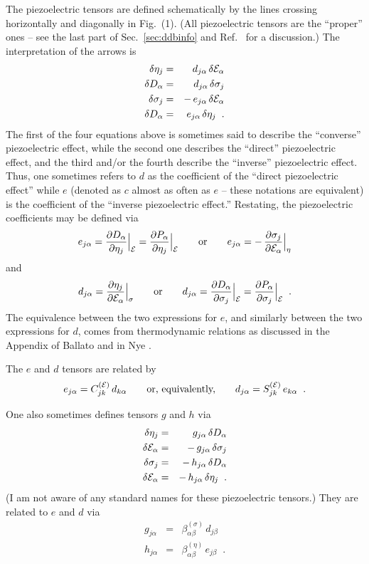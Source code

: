 \documentclass[11pt,fleqn]{article}
\def\bea{\begin{eqnarray}}
\def\nn{\nonumber\\}
\def\eea{\end{eqnarray}}
\def\beq{\begin{equation}}
\def\eeq{\end{equation}}
\def\E{{\cal E}}
\begin{document}
The piezoelectric tensors are defined schematically by the lines
crossing horizontally and diagonally in Fig.~(1).  (All piezoelectric
tensors are the ``proper'' ones -- see the last part of
Sec.~\ref{sec:ddbinfo} and Ref.~\cite{dv-piezo} for a discussion.)
The interpretation of the arrows is
%
\bea
\delta\eta_j &=& d_{j\alpha}\,\delta\E_\alpha
\nn
\delta D_\alpha &=& d_{j\alpha}\,\delta\sigma_j
\nn
\delta\sigma_j &=& -\,e_{j\alpha}\,\delta\E_\alpha
\nn
\delta D_\alpha &=& e_{j\alpha}\,\delta\eta_j
\;\;.
\eea
%
The first of the four equations above is sometimes said to describe
the ``converse'' piezoelectric effect, while the second one
describes the ``direct'' piezoelectric effect, and the third and/or
the fourth describe the ``inverse'' piezoelectric effect.  Thus,
one sometimes refers to $d$ as the coefficient of the ``direct
piezoelectric effect'' while $e$ (denoted as $c$ almost as often as
$e$ -- these notations are equivalent) is the coefficient of the
``inverse piezoelectric effect.''  Restating, the piezoelectric
coefficients may be defined via
%
\beq
e_{j\alpha}={\partial D_\alpha\over\partial\eta_j} \Big\vert_\E
           ={\partial P_\alpha\over\partial\eta_j} \Big\vert_\E
\qquad {\rm or} \qquad
e_{j\alpha}=-\,{\partial \sigma_j\over\partial\E_\alpha} \Big\vert_\eta
\label{eq:e-def}
\eeq
%
and
%
\beq
d_{j\alpha}= {\partial\eta_j\over\partial\E_\alpha} \Big\vert_\sigma
\qquad {\rm or} \qquad
d_{j\alpha}= {\partial D_\alpha\over\partial\sigma_j} \Big\vert_\E
           = {\partial P_\alpha\over\partial\sigma_j} \Big\vert_\E
\;\;.
\label{eq:d-def}
\eeq
%
The equivalence between the two expressions for $e$, and similarly between
the two expressions for $d$, comes from thermodynamic relations
as discussed in the Appendix of Ballato
\cite{ballato} and in Nye \cite{nye}.

The $e$ and $d$ tensors are related by
%
\beq
e_{j\alpha}=C^{(\E)}_{jk}\,d_{k\alpha}
\qquad \hbox{or, equivalently,} \qquad
d_{j\alpha}=S^{(\E)}_{jk}\,e_{k\alpha}
\;\;.
\eeq
%

One also sometimes defines tensors $g$ and $h$ via
%
\label{eq:gh-def}
\bea
\delta\eta_j &=& g_{j\alpha}\,\delta D_\alpha
\nn
\delta\E_\alpha &=& -\,g_{j\alpha}\,\delta\sigma_j
\nn
\delta\sigma_j &=& -\,h_{j\alpha}\,\delta D_\alpha
\nn
\delta\E_\alpha &=& -\,h_{j\alpha}\,\delta\eta_j
\;\;.
\eea
%
(I am not aware of any standard names for these piezoelectric
tensors.)  They are related to $e$ and $d$ via
%
\bea
g_{j\alpha}&=&\beta^{(\sigma)}_{\alpha\beta}\,d_{j\beta}
\\
\label{eq:h-relat}
h_{j\alpha}&=&\beta^{(\eta)}_{\alpha\beta}\,e_{j\beta}
\;\;.
\eea
%
\end{document}
